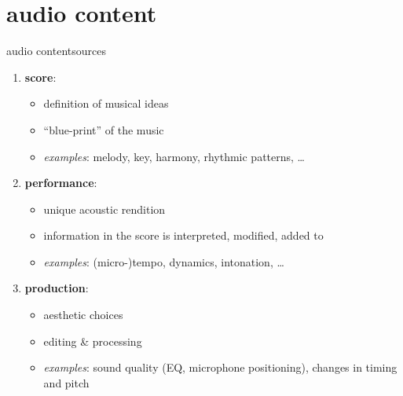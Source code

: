     \section[content]{audio content}
        \begin{frame}{audio content}{sources}

            \begin{enumerate}
                \item<2->	\textbf{score}:
                    \begin{itemize}
                        \item   definition of musical ideas
                        \item   ``blue-print'' of the music
                        \item   \textit{examples}: melody, key, harmony, rhythmic patterns, \ldots
                    \end{itemize}
                \item<3->	\textbf{performance}:
                    \begin{itemize}
                        \item   unique acoustic rendition
                        \item   information in the score is interpreted, modified, added to
                        \item   \textit{examples}: (micro-)tempo, dynamics, intonation, \ldots
                    \end{itemize}
                \item<4->	\textbf{production}:
                    \begin{itemize}
                        \item   aesthetic choices 
                        \item   editing \& processing
                        \item   \textit{examples}: sound quality (EQ, microphone positioning), changes in timing and pitch
                    \end{itemize}
            \end{enumerate}
        \end{frame}
